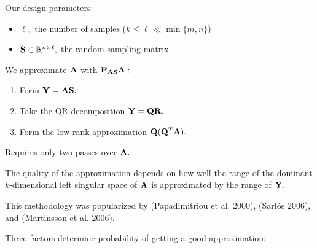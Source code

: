 \documentclass[xcolor=x11names,compress,ignorenonframetext]{beamer}
\renewcommand{\(}{\begin{columns}}
\renewcommand{\)}{\end{columns}}
\newcommand{\<}[1]{\begin{column}{#1}}
\renewcommand{\>}{\end{column}}
\def\refcolor{DodgerBlue4}
\newcommand{\refer}[1]{({\color{\refcolor}#1})}
\begin{document}
\begin{frame}
 
 Our design parameters: 
  \begin{itemize}
   \item $\ell,$ the number of samples ($k \leq \ell \ll \min\{m,n\}$) 
   \item $\mathbf{S} \in \mathbb{R}^{n \times \ell},$ the random sampling matrix.
  \end{itemize}

 \vspace{1em}
 We approximate $\mathbf{A}$ with $\mathbf{P}_{\mathbf{A} \mathbf{S}} \mathbf{A}:$
 
 \begin{enumerate}
  \item Form $\mathbf{Y} = \mathbf{A} \mathbf{S}.$
  \item Take the QR decomposition $\mathbf{Y} = \mathbf{Q} \mathbf{R}.$
  \item Form the low rank approximation $\mathbf{Q} (\mathbf{Q}^T \mathbf{A}).$
 \end{enumerate}
Requires only two passes over $\mathbf{A}.$

 \vspace{1em}
 The quality of the approximation depends on how well the range of the dominant $k$-dimensional left
 singular space of $\mathbf{A}$ is approximated by the range of $\mathbf{Y}.$
 
 \vspace{1em}
 This methodology was popularized by \refer{Papadimitriou et al. 2000}, \refer{Sarl{\'o}s 2006}, and \refer{Martinsson et al. 2006}.
\end{frame}

\begin{frame}
Three factors determine probability of getting a good approximation:


\end{frame}
\end{document}
